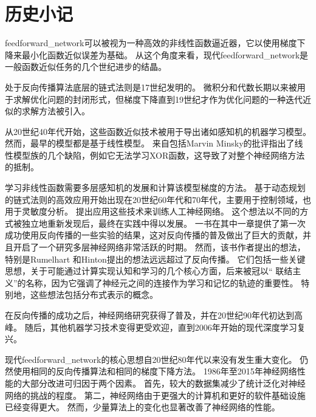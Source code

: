 \section{历史小记}
\label{sec:historical_notes}

\gls{feedforward_network}可以被视为一种高效的非线性函数逼近器，它以使用梯度下降来最小化函数近似误差为基础。
从这个角度来看，现代\gls{feedforward_network}是一般函数近似任务的几个世纪进步的结晶。
  
  
处于反向传播算法底层的链式法则是17世纪发明的\citep{Leibniz-1676,LHopital-1696}。
微积分和代数长期以来被用于求解优化问题的封闭形式，但梯度下降直到19世纪才作为优化问题的一种迭代近似的求解方法被引入\citep{cauchy1847}。

从20世纪40年代开始，这些函数近似技术被用于导出诸如感知机的机器学习模型。 
然而，最早的模型都是基于线性模型。 
来自包括Marvin Minsky的批评指出了线性模型族的几个缺陷，例如它无法学习XOR函数，这导致了对整个神经网络方法的抵制。

学习非线性函数需要多层感知机的发展和计算该模型梯度的方法。
基于动态规划的链式法则的高效应用开始出现在20世纪60年代和70年代，主要用于控制领域\citep{Kelley-1960,Bryson-et-al-1961,Dreyfus-1962,Bryson-1969,Dreyfus-1973}，也用于灵敏度分析\citep{Linnainmaa-1976}。 
\cite{Werbos-1981}提出应用这些技术来训练人工神经网络。
这个想法以不同的方式被独立地重新发现后\citep{LeCun85,Parker-1985,Rumelhart86b-small}，最终在实践中得以发展。
一书在其中一章提供了第一次成功使用反向传播的一些实验的结果\citep{Rumelhart86c}，这对反向传播的普及做出了巨大的贡献，并且开启了一个研究多层神经网络非常活跃的时期。
然而，该书作者提出的想法，特别是Rumelhart 和Hinton提出的想法远远超过了反向传播。
它们包括一些关键思想，关于可能通过计算实现认知和学习的几个核心方面，后来被冠以`` 联结主义''的名称，因为它强调了神经元之间的连接作为学习和记忆的轨迹的重要性。
特别地，这些想法包括分布式表示的概念\citep{Hinton-et-al-PDP1986}。

在反向传播的成功之后，神经网络研究获得了普及，并在20世纪90年代初达到高峰。 
随后，其他机器学习技术变得更受欢迎，直到2006年开始的现代深度学习复兴。

现代\gls{feedforward_network}的核心思想自20世纪80年代以来没有发生重大变化。
仍然使用相同的反向传播算法和相同的梯度下降方法。
1986年至2015年神经网络性能的大部分改进可归因于两个因素。
首先，较大的数据集减少了统计泛化对神经网络的挑战的程度。
第二，神经网络由于更强大的计算机和更好的软件基础设施已经变得更大。
然而，少量算法上的变化也显著改善了神经网络的性能。
  
